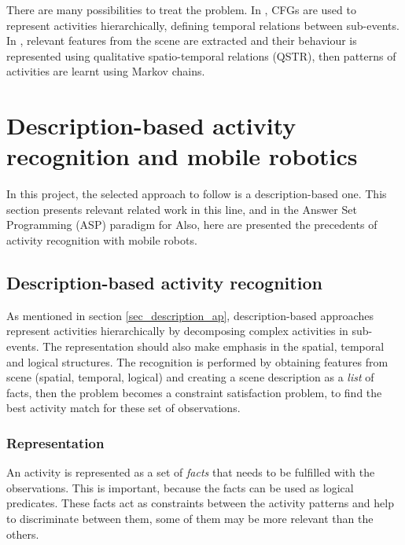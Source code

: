 There are many possibilities to treat the problem. In \citep{Nevatia2004_OntoVidEvRep,Ryoo2006_RecHuAcCFG}, CFGs are used to represent activities hierarchically, defining temporal relations between sub-events. 
In \citep{Sridhar10_UnsupervisedLearning}, relevant features from the scene are extracted and their behaviour is represented using qualitative spatio-temporal relations (QSTR), then patterns of activities are learnt using Markov chains.



\section{Description-based activity recognition and mobile robotics}

In this project, the selected approach to follow is a description-based one. 
This section presents relevant related work in this line, and in the Answer Set Programming (ASP) paradigm for 
Also, here are presented the precedents of activity recognition with mobile robots.

\subsection{Description-based activity recognition}

As mentioned in section \ref{sec_description_ap}, description-based approaches represent activities hierarchically by decomposing complex activities in sub-events.
The representation should also make emphasis in the spatial, temporal and logical structures.
The recognition is performed by obtaining features from scene (spatial, temporal, logical) and creating a scene description as a \textit{list} of facts, then the problem becomes a constraint satisfaction problem, to find the best activity match for these set of observations. 

\subsubsection{Representation}

An activity is represented as a set of \textit{facts} that needs to be fulfilled with the observations.
This is important, because the facts can be used as logical predicates.
These facts act as constraints between the activity patterns and help to discriminate between them, some of them may be more relevant than the others.

